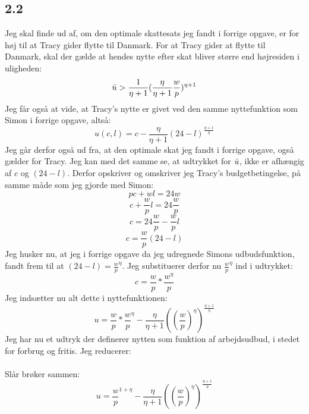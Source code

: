\documentclass{article}
\begin{document}
\subsection*{2.2}
Jeg skal finde ud af, om den optimale skattesats jeg fandt i forrige opgave, er for høj til at Tracy gider flytte til Danmark. For at Tracy gider at flytte til Danmark, skal der gælde at hendes nytte efter skat bliver større end højresiden i uligheden:
\begin{equation}
    \Bar{u}>\frac{1}{\eta + 1}(\frac{\eta}{\eta+1}\frac{w}{p})^{\eta +1}
\end{equation}
Jeg får også at vide, at Tracy's nytte er givet ved den samme nyttefunktion som Simon i forrige opgave, altså:
\begin{equation}
    u(c, l)=c-\frac{\eta}{\eta+1}(24-l)^{\frac{\eta+1}{\eta}}
\end{equation}
Jeg går derfor også ud fra, at den optimale skat jeg fandt i forrige opgave, også gælder for Tracy. Jeg kan med det samme se, at udtrykket for $\Bar{u}$, ikke er afhængig af $c$ og $(24-l)$. Derfor opskriver og omskriver jeg Tracy's budgetbetingelse, på samme måde som jeg gjorde med Simon:
\begin{equation}
    pc+wl=24w
\end{equation}
\begin{equation}
    c+ \frac{w}{p}l=24\frac{w}{p}
\end{equation}
\begin{equation}
    c=24\frac{w}{p}-\frac{w}{p}l
\end{equation}
\begin{equation}
    c=\frac{w}{p}(24-l)
\end{equation}
Jeg husker nu, at jeg i forrige opgave da jeg udregnede Simons udbudsfunktion, fandt frem til at $(24-l)=\frac{w}{p}^{\eta}$. Jeg substituerer derfor nu $\frac{w}{p}^{\eta}$ ind i udtrykket:
\begin{equation}
    c=\frac{w}{p}*\frac{w^{\eta}}{p}
\end{equation}
Jeg indsætter nu alt dette i nyttefunktionen:
\begin{equation}
    u=\frac{w}{p}*\frac{w}{p}^{\eta}-\frac{\eta}{\eta+1}((\frac{w}{p})^{\eta})^{\frac{\eta+1}{\eta}}
\end{equation}
Jeg har nu et udtryk der definerer nytten som funktion af arbejdsudbud, i stedet for forbrug og fritis. Jeg reducerer:
\\
\\
Slår brøker sammen:
\begin{equation}
    u=\frac{w}{p}^{1+\eta}-\frac{\eta}{\eta+1}((\frac{w}{p})^{\eta})^{\frac{\eta+1}{\eta}}
\end{equation}
\end{document}
